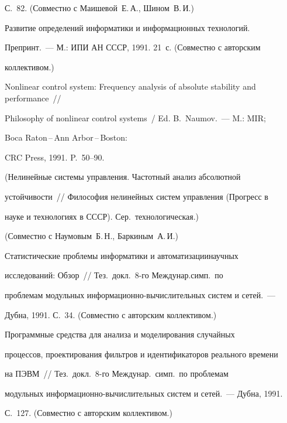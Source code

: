 С.~82. (Совместно с Маишевой~Е.\,А., Шином~В.\,И.)





 Развитие определений информатики и информационных технологий.


Препринт.~--- М.: ИПИ АН СССР, 1991. 21~с. (Совместно с авторским


коллективом.)





 Nonlinear control system: Frequency analysis of absolute stability and performance~//


 Philosophy of nonlinear control systems~/ Ed. B.~Naumov.~--- M.: MIR;


 Boca Raton\,--\,Ann Arbor\,--\,Boston:


 CRC Press, 1991. P.~50--90.


(Нелинейные системы управ\-ле\-ния. Частотный анализ абсолютной


устойчивости~// Философия нелинейных систем управ\-ле\-ния (Прогресс в


науке и технологиях в СССР). Сер.\ технологическая.)


(Совместно с Наумовым~Б.\,Н., Баркиным~А.\,И.)





 Статистические проблемы информатики и автоматизации\linebreak научных


исследований: Обзор~// Тез.\ докл.\ 8-го Междунар.\linebreak симп.\ по


проблемам модульных ин\-фор\-ма\-ци\-он\-но-вы\-чис\-ли\-тель\-ных сис\-тем и сетей.~---


Дубна, 1991. С.~34. (Совместно с авторским коллективом.)





 Программные средства для анализа и моделирования случайных


процессов, проектирования фильтров и идентификаторов реального времени


на ПЭВМ~// Тез.\ докл.\ 8-го Междунар.\ симп.\ по проблемам


модульных ин\-фор\-ма\-ци\-он\-но-вы\-чис\-ли\-тель\-ных сис\-тем и сетей.~--- Дубна, 1991.


С.~127. (Совместно с авторским коллективом.)





